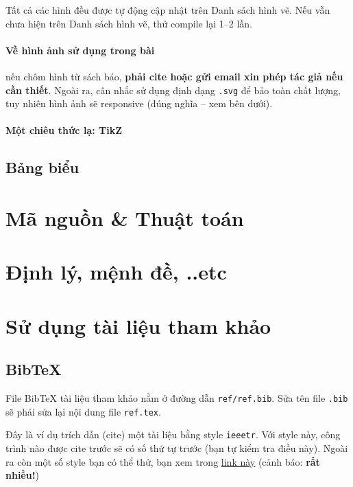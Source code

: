Tất cả các hình đều được tự động cập nhật trên Danh sách hình vẽ. Nếu vẫn chưa hiện trên Danh sách hình vẽ, thử compile lại 1--2 lần.

\paragraph{Về hình ảnh sử dụng trong bài} nếu chôm hình từ sách báo, \textbf{phải cite hoặc gửi email xin phép tác giả nếu cần thiết}. Ngoài ra, cân nhắc sử dụng định dạng \texttt{.svg} để bảo toàn chất lượng, tuy nhiên hình ảnh sẽ responsive (đúng nghĩa -- xem bên dưới).

 

\paragraph{Một chiêu thức lạ: TikZ}



\subsection{Bảng biểu}

\section{Mã nguồn \& Thuật toán}

\section{Định lý, mệnh đề, ..etc}

\section{Sử dụng tài liệu tham khảo}

\subsection{BibTeX}

File BibTeX tài liệu tham khảo nằm ở đường dẫn \texttt{ref/ref.bib}. Sửa tên file \texttt{.bib} sẽ phải sửa lại nội dung file \texttt{ref.tex}.

Đây là ví dụ trích dẫn (cite) một tài liệu\cite{greenwade93, goossens93} bằng style \texttt{ieeetr}. Với style này, công trình nào được cite trước sẽ có số thứ tự trước (bạn tự kiểm tra điều này). Ngoài ra còn một số style bạn có thể thử, bạn xem trong \href{https://www.bibtex.com/bibliography-styles/}{link này} (cảnh báo: \textbf{rất nhiều!})

